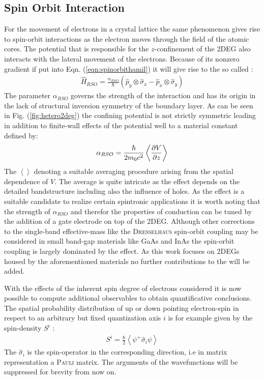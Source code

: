 \subsection{Spin Orbit Interaction}
For the movement of electrons in a crystal lattice the same phenomenon gives rise to spin-orbit interactions as the electron moves through the field of the atomic cores.
The potential that is responsible for the $z$-confinement of the 2DEG also interacts with the lateral movement of the electrons. Because of its nonzero gradient if put into Eqn. (\ref{eqn:spinorbithamil}) it will give rise to the so called \rash{} \hamil{}:
\begin{align}
  \hat{H}_{RSO} =\frac{\alpha_{RSO}}{\hbar}(\hat{p}_{y} \otimes \hat{\sigma}_{x} - \hat{p}_{x} \otimes \hat{\sigma}_{y})
	\label{eqn:rashbahamiltonian}
\end{align}
The parameter $\alpha_{RSO}$ governs the strength of the interaction and has its origin in the lack of structural inversion symmetry of the boundary layer.
As can be seen in Fig. (\ref{fig:hetero2deg}) the confining potential is not strictly symmetric leading in addition to finite-wall effects of the potential well to a material constant defined by\cite{Metalidis2007Thesis}:
\begin{align}
\alpha_{RSO} = \frac{\hbar}{2m_0c^2} \left<\frac{\partial V}{\partial z} \right> 
\end{align}
The $\left< \right>$ denoting a suitable averaging procedure arising from the spatial dependence of $V$. The average is quite intricate as the effect depends on the detailed bandstructure including also the influence of holes\cite{JApplPhys.83.4324}.
As the \rash{} effect is a suitable candidate to realize certain spintronic applications it is worth noting that the strength of $\alpha_{RSO}$ and therefor the properties of conduction can be tuned by the addition of a gate electrode on top of the 2DEG\cite{PhysRevLett.78.1335}.
Although other corrections to the single-band effective-mass \hamil{} like the \textsc{Dresselhaus} spin-orbit coupling \cite{PhysRev.100.580} may be considered in small band-gap materials like GaAs and InAs the spin-orbit coupling is largely dominated by the \rash{} effect\cite{PhysRevB.61.15588}. As this work focuses on 2DEGs housed by the aforementioned materials no further contributions to the \hamil{} will be added.\par
With the effects of the inherent spin degree of electrons considered it is now possible to compute additional observables to obtain quantificative conclusions.
The spatial probability distribution of up or down pointing electron-spin in respect to an arbitrary but fixed quantization axis $i$ is for example given by the spin-density $S^i$ \cite{JPhysA:MathGen.18.671}:
\begin{align}
S^i  = \frac{\hbar}{2} \left< \psi^+ \hat{\sigma}_i \psi \right>
\label{eqn:spindensity}
\end{align}
The $\hat{\sigma}_i$ is the spin-operator in the corresponding direction, i.e in matrix representation a \textsc{Pauli} matrix. The arguments of the wavefunctions will be suppressed for brevity from now on.
